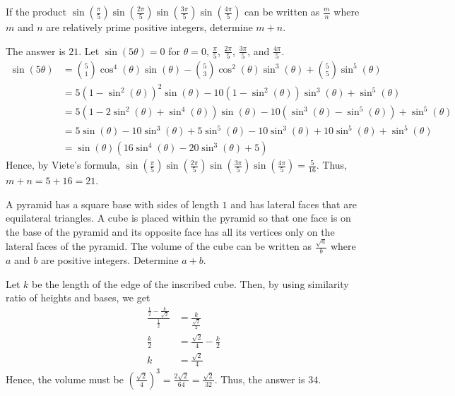 \begin{problem}
If the product $\sin(\frac{\pi}{5})\sin(\frac{2\pi}{5})\sin(\frac{3\pi}{5})\sin(\frac{4\pi}{5})$ can be written as $\frac{m}{n}$ where $m$ and $n$ are relatively prime positive integers, determine $m+n$.
\end{problem}

\begin{solution}
The answer is $21$. Let $\sin(5\theta)=0$ for $\theta=0$, $\frac{\pi}{5}$, $\frac{2\pi}{5}$, $\frac{3\pi}{5}$, and $\frac{4\pi}{5}$.
\begin{align*}
    \sin(5\theta) &= \binom{5}{1}\cos^4(\theta)\sin(\theta)-\binom{5}{3}\cos^2(\theta)\sin^3(\theta)+\binom{5}{5}\sin^5(\theta)\\
    &= 5(1-\sin^2(\theta))^2\sin(\theta)-10(1-\sin^2(\theta))\sin^3(\theta)+\sin^5(\theta)\\
    &= 5(1-2\sin^2(\theta)+\sin^4(\theta))\sin(\theta)-10(\sin^3(\theta)-\sin^5(\theta))+\sin^5(\theta)\\
    &=5\sin(\theta)-10\sin^3(\theta)+5\sin^5(\theta)-10\sin^3(\theta)+10\sin^5(\theta)+\sin^5(\theta)\\
    &=\sin(\theta)(16\sin^4(\theta)-20\sin^3(\theta)+5)
\end{align*}
Hence, by Viete's formula, $\sin(\frac{\pi}{5})\sin(\frac{2\pi}{5})\sin(\frac{3\pi}{5})\sin(\frac{4\pi}{5})=\frac{5}{16}$. Thus, $m+n=5+16=21$.
\end{solution}

\begin{problem}
A pyramid has a square base with sides of length $1$ and has lateral faces that are equilateral triangles. A cube is placed within the pyramid so that one face is on the base of the pyramid and its opposite face has all its vertices only on the lateral faces of the pyramid. The volume of the cube can be written as $\frac{\sqrt{a}}{b}$ where $a$ and $b$ are positive integers. Determine $a+b$.
\end{problem}

\begin{solution}
Let $k$ be the length of the edge of the inscribed cube. Then, by using similarity ratio of heights and bases, we get 
\begin{align*}
\frac{\frac12-\frac{k}{\sqrt{2}}}{\frac12}&=\frac{k}{\frac{\sqrt{2}}{2}}\\
\frac{k}{2}&=\frac{\sqrt{2}}{4}-\frac{k}{2}\\
k&=\frac{\sqrt{2}}{4}
\end{align*}
Hence, the volume must be $(\frac{\sqrt{2}}{4})^3=\frac{2\sqrt{2}}{64}=\frac{\sqrt{2}}{32}$. Thus, the answer is $34$.
\end{solution}

